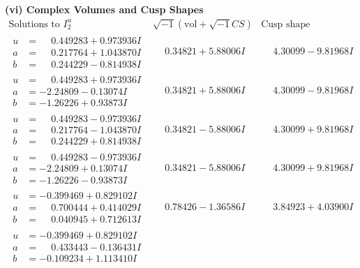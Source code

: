 \documentclass[1p]{elsarticle_modified}
\theoremstyle{definition}
\newcommand{\I}{\sqrt{-1}}
\begin{document}
\newpage\flushleft \textbf{(vi) Complex Volumes and Cusp Shapes}
$$\begin{array}{c|c|c}  
\text{Solutions to }I^u_{2}& \I (\text{vol} + \sqrt{-1}CS) & \text{Cusp shape}\\
 \hline 
\begin{aligned}
u &= \phantom{-}0.449283 + 0.973936 I \\
a &= \phantom{-}0.217764 + 1.043870 I \\
b &= \phantom{-}0.244229 - 0.814938 I\end{aligned}
 & \phantom{-}0.34821 + 5.88006 I & \phantom{-}4.30099 - 9.81968 I \\ \hline\begin{aligned}
u &= \phantom{-}0.449283 + 0.973936 I \\
a &= -2.24809 - 0.13074 I \\
b &= -1.26226 + 0.93873 I\end{aligned}
 & \phantom{-}0.34821 + 5.88006 I & \phantom{-}4.30099 - 9.81968 I \\ \hline\begin{aligned}
u &= \phantom{-}0.449283 - 0.973936 I \\
a &= \phantom{-}0.217764 - 1.043870 I \\
b &= \phantom{-}0.244229 + 0.814938 I\end{aligned}
 & \phantom{-}0.34821 - 5.88006 I & \phantom{-}4.30099 + 9.81968 I \\ \hline\begin{aligned}
u &= \phantom{-}0.449283 - 0.973936 I \\
a &= -2.24809 + 0.13074 I \\
b &= -1.26226 - 0.93873 I\end{aligned}
 & \phantom{-}0.34821 - 5.88006 I & \phantom{-}4.30099 + 9.81968 I \\ \hline\begin{aligned}
u &= -0.399469 + 0.829102 I \\
a &= \phantom{-}0.700444 + 0.414029 I \\
b &= \phantom{-}0.040945 + 0.712613 I\end{aligned}
 & \phantom{-}0.78426 - 1.36586 I & \phantom{-}3.84923 + 4.03900 I \\ \hline\begin{aligned}
u &= -0.399469 + 0.829102 I \\
a &= \phantom{-}0.433443 - 0.136431 I \\
b &= -0.109234 + 1.113410 I\end{aligned}

\end{array}$$
\end{document}
